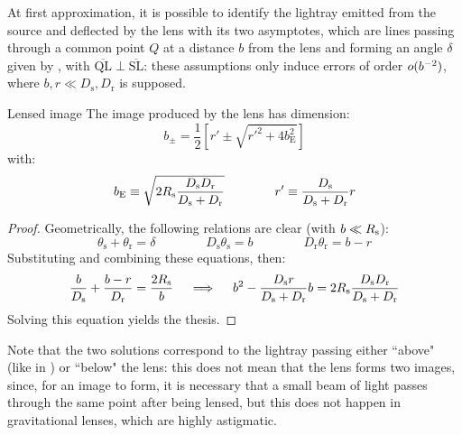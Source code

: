 At first approximation, it is possible to identify the lightray emitted from the source and deflected by the lens with its two asymptotes, which are lines passing through a common point $ Q $ at a distance $ b $ from the lens and forming an angle $ \delta $ given by , with $ \overline{\text{QL}} \perp \overline{\text{SL}} $: these assumptions only induce errors of order $ o(b^{-2}) $, where $ b,r \ll D_\text{s} , D_\text{r} $ is supposed.

\begin{proposition}{Lensed image}{}
  The image produced by the lens has dimension:
  \begin{equation}
    b_\pm = \frac{1}{2} \left[ r' \pm \sqrt{r'^2 + 4b_\text{E}^2} \right]
    \label{eq:grav-lensing}
  \end{equation}
  with:
  \begin{equation}
    b_\text{E} \equiv \sqrt{2R_\text{s} \frac{D_\text{s} D_\text{r}}{D_\text{s} + D_\text{r}}}
    \qquad \qquad
    r' \equiv \frac{D_\text{s}}{D_\text{s} + D_\text{r}} r
  \end{equation}
\end{proposition}

\begin{proofbox}
  \begin{proof}
    Geometrically, the following relations are clear (with $ b \ll R_\text{s} $):
    \begin{equation*}
      \theta_\text{s} + \theta_\text{r} = \delta
      \qquad \qquad
      D_\text{s} \theta_\text{s} = b
      \qquad \qquad
      D_\text{r} \theta_\text{r} = b - r
    \end{equation*}
    Substituting  and combining these equations, then:
    \begin{equation*}
      \frac{b}{D_\text{s}} + \frac{b - r}{D_\text{r}} = \frac{2R_\text{s}}{b}
      \quad \implies \quad
      b^2 - \frac{D_\text{s} r}{D_\text{s} + D_\text{r}} b = 2R_\text{s} \frac{D_\text{s} D_\text{r}}{D_\text{s} + D_\text{r}}
    \end{equation*}
    Solving this equation yields the thesis.
  \end{proof}
\end{proofbox}

Note that the two solutions correspond to the lightray passing either ``above" (like in ) or ``below" the lens: this does not mean that the lens forms two images, since, for an image to form, it is necessary that a small beam of light passes through the same point after being lensed, but this does not happen in gravitational lenses, which are highly astigmatic.

